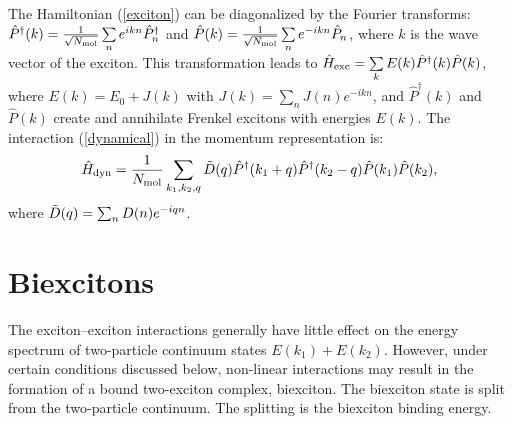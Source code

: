  The Hamiltonian (\ref{exciton}) can be diagonalized by the Fourier transforms: $\hat{P}^\dag(k) = \frac{1}{\sqrt{N_{\rm mol}}}
\sum\limits_n e^{ikn} \hat{P}_n^\dag$ and $\hat{P}(k) =
\frac{1}{\sqrt{N_{\rm mol}}} \sum\limits_n e^{-ikn} \hat{P}_n$,  where
$k$ is the wave vector of the exciton.  This transformation leads to 
 $\hat{H}_{\rm exc} = \sum\limits_k E(k)
\hat{P}^\dag(k) \hat{P}(k)$, where $E(k) = E_0 + J(k)$ with $J(k) =
\sum\limits_n J(n) e^{-ikn}$, and  $\hat{P}^\dag(k)$ and $\hat{P}(k)$ 
create and annihilate Frenkel excitons with energies $E(k)$.  The interaction (\ref{dynamical})
in the momentum representation is: 
\begin{equation}\label{dynamical-k}
\hat{H}_{\rm dyn} = \frac{1}{N_{\rm mol}} \sum\limits_{k_1, k_2, q} \Tilde{D}(q)
\hat{P}^\dag(k_1+q) \hat{P}^\dag(k_2-q) \hat{P}(k_1) \hat{P}(k_2),
\end{equation}
where $\Tilde{D}(q) = \sum_n D(n) e^{-iqn}$. 



\section{Biexcitons}
\label{sec:biexciton}
The exciton--exciton interactions generally have little effect on the energy spectrum of two-particle
continuum states $E(k_1) + E(k_2)$. However, under certain conditions discussed below, non-linear
interactions may result in the formation of a bound two-exciton
complex, biexciton. The biexciton state is split from the
two-particle continuum. The splitting is the biexciton binding energy. 

